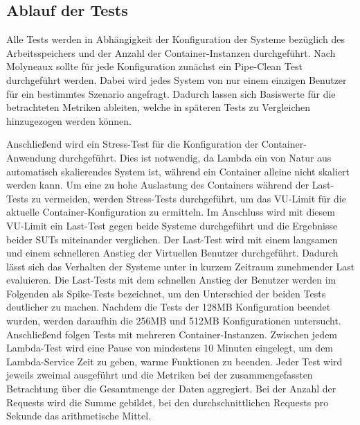 \subsection{Ablauf der Tests}
Alle Tests werden in Abhängigkeit der Konfiguration der Systeme bezüglich des Arbeitsspeichers und der Anzahl der Container-Instanzen durchgeführt.
Nach Molyneaux sollte für jede Konfiguration zunächst ein Pipe-Clean Test durchgeführt werden\cite{molyneaux_art_2014}. Dabei wird jedes System von nur einem einzigen Benutzer für ein bestimmtes Szenario angefragt. Dadurch lassen sich Basiswerte für die betrachteten Metriken ableiten, welche in späteren Tests zu Vergleichen hinzugezogen werden können.

Anschließend wird ein Stress-Test für die Konfiguration der Container-Anwendung durchgeführt. Dies ist notwendig, da Lambda ein von Natur aus automatisch skalierendes System ist, während ein Container alleine nicht skaliert werden kann. Um eine zu hohe Auslastung des Containers während der Last-Tests zu vermeiden, werden Stress-Tests durchgeführt, um das \ac{VU}-Limit für die aktuelle Container-Konfiguration zu ermitteln. 
Im Anschluss wird mit diesem \ac{VU}-Limit ein Last-Test gegen beide Systeme durchgeführt und die Ergebnisse beider \acp{SUT} miteinander verglichen. 
Der Last-Test wird mit einem langsamen und einem schnelleren Anstieg der Virtuellen Benutzer durchgeführt. Dadurch lässt sich das Verhalten der Systeme unter in kurzem Zeitraum zunehmender Last evaluieren. Die Last-Tests mit dem schnellen Anstieg der Benutzer werden im Folgenden als Spike-Tests bezeichnet, um den Unterschied der beiden Tests deutlicher zu machen. Nachdem die Tests der 128MB Konfiguration beendet wurden, werden daraufhin die 256MB und 512MB Konfigurationen untersucht. Anschließend folgen Tests mit mehreren Container-Instanzen.
Zwischen jedem Lambda-Test wird eine Pause von mindestens 10 Minuten eingelegt, um dem Lambda-Service Zeit zu geben, warme Funktionen zu beenden. Jeder Test wird jeweils zweimal ausgeführt und die Metriken bei der zusammengefassten Betrachtung über die Gesamtmenge der Daten aggregiert. Bei der Anzahl der Requests wird die Summe gebildet, bei den durchschnittlichen Requests pro Sekunde das arithmetische Mittel.